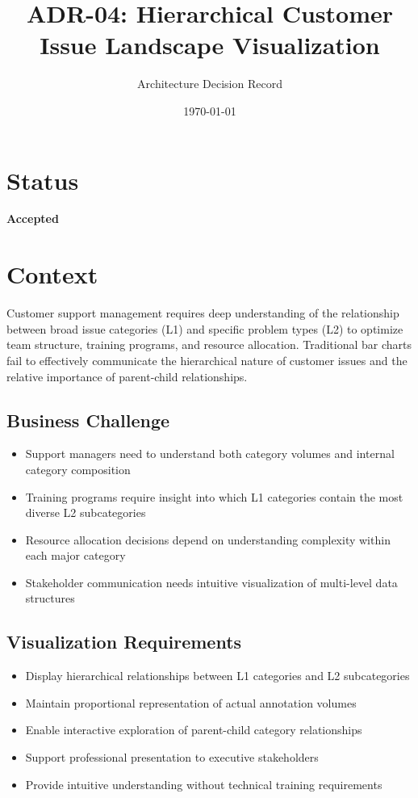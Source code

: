 \documentclass[11pt]{article}
\title{\textbf{ADR-04: Hierarchical Customer Issue Landscape Visualization}}
\author{Architecture Decision Record}
\date{\today}
\begin{document}
\maketitle

\section{Status}
\textbf{Accepted}

\section{Context}

Customer support management requires deep understanding of the relationship between broad issue categories (L1) and specific problem types (L2) to optimize team structure, training programs, and resource allocation. Traditional bar charts fail to effectively communicate the hierarchical nature of customer issues and the relative importance of parent-child relationships.

\subsection{Business Challenge}
\begin{itemize}
\item Support managers need to understand both category volumes and internal category composition
\item Training programs require insight into which L1 categories contain the most diverse L2 subcategories
\item Resource allocation decisions depend on understanding complexity within each major category
\item Stakeholder communication needs intuitive visualization of multi-level data structures
\end{itemize}

\subsection{Visualization Requirements}
\begin{itemize}
\item Display hierarchical relationships between L1 categories and L2 subcategories
\item Maintain proportional representation of actual annotation volumes
\item Enable interactive exploration of parent-child category relationships
\item Support professional presentation to executive stakeholders
\item Provide intuitive understanding without technical training requirements
\end{itemize}
\end{document}

